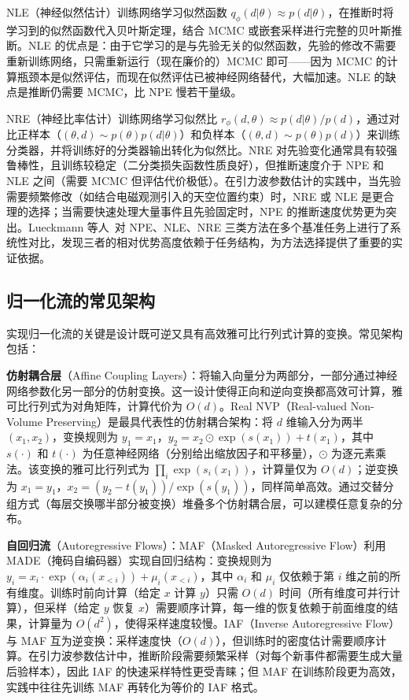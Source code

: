 NLE（神经似然估计）训练网络学习似然函数 $q_\phi(d|\theta) \approx p(d|\theta)$，在推断时将学习到的似然函数代入贝叶斯定理，结合 MCMC 或嵌套采样进行完整的贝叶斯推断。NLE 的优点是：由于它学习的是与先验无关的似然函数，先验的修改不需要重新训练网络，只需重新运行（现在廉价的）MCMC 即可——因为 MCMC 的计算瓶颈本是似然评估，而现在似然评估已被神经网络替代，大幅加速。NLE 的缺点是推断仍需要 MCMC，比 NPE 慢若干量级。

NRE（神经比率估计）训练网络学习似然比 $r_\phi(d, \theta) \approx p(d|\theta)/p(d)$，通过对比正样本（$(\theta, d) \sim p(\theta)p(d|\theta)$）和负样本（$(\theta, d) \sim p(\theta)p(d)$）来训练分类器，并将训练好的分类器输出转化为似然比。NRE 对先验变化通常具有较强鲁棒性，且训练较稳定（二分类损失函数性质良好），但推断速度介于 NPE 和 NLE 之间（需要 MCMC 但评估代价极低）。在引力波参数估计的实践中，当先验需要频繁修改（如结合电磁观测引入的天空位置约束）时，NRE 或 NLE 是更合理的选择；当需要快速处理大量事件且先验固定时，NPE 的推断速度优势更为突出。Lueckmann 等人~\cite{Lueckmann2021benchmarking}对 NPE、NLE、NRE 三类方法在多个基准任务上进行了系统性对比，发现三者的相对优势高度依赖于任务结构，为方法选择提供了重要的实证依据。

\subsection{归一化流的常见架构}

实现归一化流的关键是设计既可逆又具有高效雅可比行列式计算的变换。常见架构包括：

\textbf{仿射耦合层}（Affine Coupling Layers）：将输入向量分为两部分，一部分通过神经网络参数化另一部分的仿射变换。这一设计使得正向和逆向变换都高效可计算，雅可比行列式为对角矩阵，计算代价为 $O(d)$。Real NVP（Real-valued Non-Volume Preserving）是最具代表性的仿射耦合架构：将 $d$ 维输入分为两半 $(x_1, x_2)$，变换规则为 $y_1 = x_1$，$y_2 = x_2 \odot \exp(s(x_1)) + t(x_1)$，其中 $s(\cdot)$ 和 $t(\cdot)$ 为任意神经网络（分别给出缩放因子和平移量），$\odot$ 为逐元素乘法。该变换的雅可比行列式为 $\prod_i \exp(s_i(x_1))$，计算量仅为 $O(d)$；逆变换为 $x_1 = y_1$，$x_2 = (y_2 - t(y_1))/\exp(s(y_1))$，同样简单高效。通过交替分组方式（每层交换哪半部分被变换）堆叠多个仿射耦合层，可以建模任意复杂的分布。

\textbf{自回归流}（Autoregressive Flows）：MAF（Masked Autoregressive Flow）利用 MADE（掩码自编码器）实现自回归结构：变换规则为 $y_i = x_i \cdot \exp(\alpha_i(x_{<i})) + \mu_i(x_{<i})$，其中 $\alpha_i$ 和 $\mu_i$ 仅依赖于第 $i$ 维之前的所有维度。训练时前向计算（给定 $x$ 计算 $y$）只需 $O(d)$ 时间（所有维度可并行计算），但采样（给定 $y$ 恢复 $x$）需要顺序计算，每一维的恢复依赖于前面维度的结果，计算量为 $O(d^2)$，使得采样速度较慢。IAF（Inverse Autoregressive Flow）与 MAF 互为逆变换：采样速度快（$O(d)$），但训练时的密度估计需要顺序计算。在引力波参数估计中，推断阶段需要频繁采样（对每个新事件都需要生成大量后验样本），因此 IAF 的快速采样特性更受青睐；但 MAF 在训练阶段更为高效，实践中往往先训练 MAF 再转化为等价的 IAF 格式。

